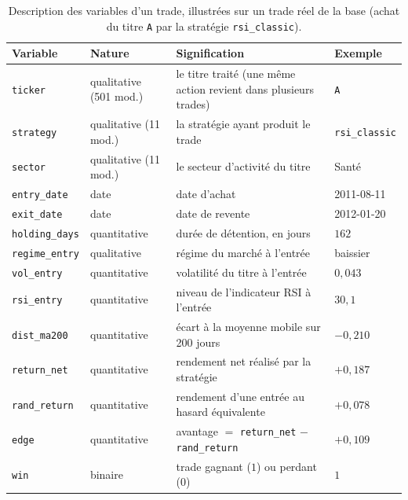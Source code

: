 \begin{table}[H]
\centering
\caption{Description des variables d'un trade, illustrées sur un trade réel
de la base (achat du titre \texttt{A} par la stratégie \texttt{rsi\_classic}).}
\label{tab:dico-trades}
\renewcommand{\arraystretch}{1.3}
\small
\begin{tabular}{@{}>{\raggedright\arraybackslash}p{2.4cm}>{\raggedright\arraybackslash}p{2.6cm}>{\raggedright\arraybackslash}p{5.6cm}l@{}}
\toprule
Variable & Nature & Signification & Exemple \\
\midrule
\texttt{ticker}       & qualitative (501 mod.) & le titre traité (une même action revient dans plusieurs trades) & \texttt{A} \\
\texttt{strategy}     & qualitative (11 mod.)  & la stratégie ayant produit le trade & \texttt{rsi\_classic} \\
\texttt{sector}       & qualitative (11 mod.)  & le secteur d'activité du titre & Santé \\
\texttt{entry\_date}  & date                   & date d'achat & 2011-08-11 \\
\texttt{exit\_date}   & date                   & date de revente & 2012-01-20 \\
\texttt{holding\_days}& quantitative           & durée de détention, en jours & $162$ \\
\texttt{regime\_entry}& qualitative            & régime du marché à l'entrée & baissier \\
\texttt{vol\_entry}   & quantitative           & volatilité du titre à l'entrée & $0{,}043$ \\
\texttt{rsi\_entry}   & quantitative           & niveau de l'indicateur RSI à l'entrée & $30{,}1$ \\
\texttt{dist\_ma200}  & quantitative           & écart à la moyenne mobile sur 200 jours & $-0{,}210$ \\
\texttt{return\_net}  & quantitative           & rendement net réalisé par la stratégie & $+0{,}187$ \\
\texttt{rand\_return} & quantitative           & rendement d'une entrée au hasard équivalente & $+0{,}078$ \\
\texttt{edge}         & quantitative           & avantage $=$ \texttt{return\_net} $-$ \texttt{rand\_return} & $+0{,}109$ \\
\texttt{win}          & binaire                & trade gagnant ($1$) ou perdant ($0$) & $1$ \\
\bottomrule
\end{tabular}
\end{table}

